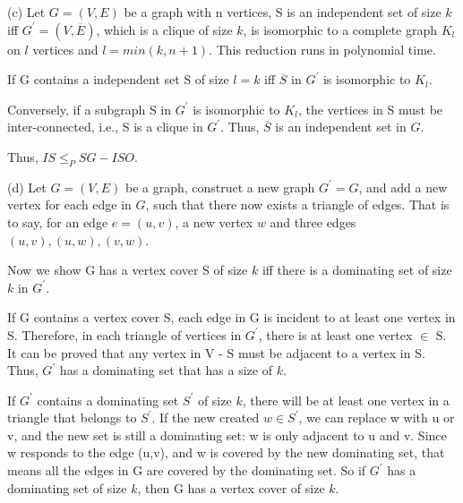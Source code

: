 \documentclass[paper=a4, fontsize=12pt]{scrartcl} %
\numberwithin{equation}{section} %
\numberwithin{figure}{section} %
\numberwithin{table}{section} %
\begin{document}
(c) \quad Let $G = (V,E)$ be a graph with n vertices, S is an independent set of size $k$ iff $G^{'} = (V,\overline{E})$, which is a clique of size $k$, is isomorphic to a complete graph $K_l$ on $l$ vertices and $l = min(k, n+1)$. This reduction runs in polynomial time. \par 
If G contains a independent set S of size $l = k$ iff $\overline{S}$ in $G^'$ is isomorphic to $K_l$. \par 
Conversely, if a subgraph S in $G^'$ is isomorphic to $K_l$, the vertices in S must be inter-connected, i.e., S is a clique in $G^'$. Thus, $\overline{S}$ is an independent set in $G$. \par 
Thus, $IS \leq_P SG-ISO$.

(d) \quad Let $G = (V,E)$ be a graph, construct a new graph $G^{'} = G$, and add a new vertex for each edge in $G$, such that there now exists a triangle of edges. That is to say, for an edge $e = (u,v)$, a new vertex $w$ and three edges $(u, v), (u,w), (v,w)$. \par
Now we show G has a vertex cover S of size $k$ iff there is a dominating set of size $k$ in $G^'$.\par
If G contains a vertex cover S, each edge in G is incident to at least one vertex in S. Therefore, in each triangle of vertices in $G^'$, there is at least one vertex $\in$ S. It can be proved that any vertex in V - S must be adjacent to a vertex in S. Thus, $G^'$ has a dominating set that has a size of $k$.\par
If $G^'$ contains a dominating set $S^'$ of size $k$, there will be at least one vertex in a triangle that belongs to $S^'$. If the new created $w \in S^'$, we can replace w with u or v, and the new set is still a dominating set: w is only adjacent to u and v. Since w responds to the edge (u,v), and w is covered by the new dominating set, that means all the edges in G are covered by the dominating set. So if $G^'$ has a dominating set of size $k$, then G has a vertex cover of size $k$.  
\end{document}
